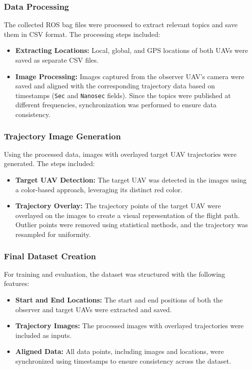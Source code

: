 \subsubsection{ Data Processing}
The collected ROS bag files were processed to extract relevant topics and save them in CSV format. The processing steps included:
\begin{itemize}
    \item \textbf{Extracting Locations:} Local, global, and GPS locations of both UAVs were saved as separate CSV files.
    \item \textbf{Image Processing:} Images captured from the observer UAV’s camera were saved and aligned with the corresponding trajectory data based on timestamps (\texttt{Sec} and \texttt{Nanosec} fields). Since the topics were published at different frequencies, synchronization was performed to ensure data consistency.
\end{itemize}

\subsubsection{Trajectory Image Generation}
Using the processed data, images with overlayed target UAV trajectories were generated. The steps included:
\begin{itemize}
    \item \textbf{Target UAV Detection:} The target UAV was detected in the images using a color-based approach, leveraging its distinct red color.
    \item \textbf{Trajectory Overlay:} The trajectory points of the target UAV were overlayed on the images to create a visual representation of the flight path. Outlier points were removed using statistical methods, and the trajectory was resampled for uniformity.
\end{itemize}

\subsubsection{ Final Dataset Creation}
For training and evaluation, the dataset was structured with the following features:
\begin{itemize}
    \item \textbf{Start and End Locations:} The start and end positions of both the observer and target UAVs were extracted and saved.
    \item \textbf{Trajectory Images:} The processed images with overlayed trajectories were included as inputs.
    \item \textbf{Aligned Data:} All data points, including images and locations, were synchronized using timestamps to ensure consistency across the dataset.
\end{itemize}


